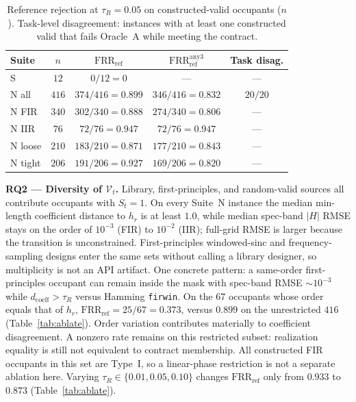 \documentclass{article}
\begin{document}
\begin{table}[t]
\caption{Reference rejection at $\tau_R=0.05$ on constructed-valid
occupants ($n$).
Task-level disagreement: instances with at least one constructed
valid that fails Oracle~A while meeting the contract.}
\label{tab:frr}
\centering
\footnotesize
\setlength{\tabcolsep}{3.0pt}
\begin{tabular}{@{}lcccc@{}}
\hline
Suite & $n$ & $\mathrm{FRR}_{\mathrm{ref}}$ & $\mathrm{FRR}_{\mathrm{ref}}^{\mathrm{any3}}$ & Task disag. \\
\hline
S & $12$ & $0/12=0$ & --- & --- \\
N all & $416$ & $374/416=0.899$ & $346/416=0.832$ & $20/20$ \\
N FIR & $340$ & $302/340=0.888$ & $274/340=0.806$ & --- \\
N IIR & $76$ & $72/76=0.947$ & $72/76=0.947$ & --- \\
N loose & $210$ & $183/210=0.871$ & $177/210=0.843$ & --- \\
N tight & $206$ & $191/206=0.927$ & $169/206=0.820$ & --- \\
\hline
\end{tabular}
\end{table}

\noindent\textbf{RQ2 --- Diversity of $\mathcal{V}_t$.}
Library, first-principles, and random-valid sources all contribute
occupants with $S_t=1$.
On every Suite~N instance the median min-length coefficient distance
to $h_r$ is at least $1.0$, while median spec-band $\lvert H\rvert$
RMSE stays on the order of $10^{-3}$ (FIR) to $10^{-2}$ (IIR);
full-grid RMSE is larger because the transition is unconstrained.
First-principles windowed-sinc and frequency-sampling designs enter
the same sets without calling a library designer, so multiplicity is
not an API artifact.
One concrete pattern: a same-order first-principles occupant can remain
inside the mask with spec-band RMSE $\sim 10^{-3}$ while
$d_{\mathrm{coeff}}>\tau_R$ versus Hamming \texttt{firwin}.
On the $67$ occupants whose order equals that of $h_r$,
$\mathrm{FRR}_{\mathrm{ref}}=25/67=0.373$, versus $0.899$ on the
unrestricted $416$ (Table~\ref{tab:ablate}).
Order variation contributes materially to coefficient disagreement.
A nonzero rate remains on this restricted subset: realization
equality is still not equivalent to contract membership.
All constructed FIR occupants in this set are Type~I, so a
linear-phase restriction is not a separate ablation here.
Varying $\tau_R\in\{0.01,0.05,0.10\}$ changes
$\mathrm{FRR}_{\mathrm{ref}}$ only from $0.933$ to $0.873$
(Table~\ref{tab:ablate}).
\end{document}

